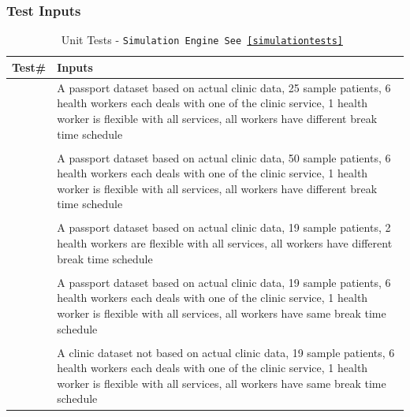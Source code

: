 \documentclass[12pt]{article}
\newcounter{TestCounter}
\begin{document}
	
	\subsubsection{Test Inputs}
	\begin{center}
		\begin{longtable}{c>{\raggedright\arraybackslash}p{8.8cm} }
			\caption{Unit Tests - \texttt{Simulation Engine See \ref{simulationtests} }}\label{SimulationEngine_unit}\\
			\toprule
			\bf Test\# & \bf Inputs \\\midrule
			{TestCounter}\arabic{TestCounter}
			& A passport dataset based on actual clinic data, 25 sample patients, 
			6 health workers each deals with one of the clinic service, 
			1 health worker is flexible with all services, all workers have different break time schedule \\
			\\\midrule
			{TestCounter}\arabic{TestCounter}
			& A passport dataset based on actual clinic data, 50 sample patients, 
			6 health workers each deals with one of the clinic service, 
			1 health worker is flexible with all services, all workers have different break time schedule \\
			\\\midrule
			{TestCounter}\arabic{TestCounter}
			& A passport dataset based on actual clinic data, 19 sample patients, 
			2 health workers are flexible with all services, all workers have different break time schedule \\
			\\\midrule
			{TestCounter}\arabic{TestCounter}
			& A passport dataset based on actual clinic data, 19 sample patients, 
			6 health workers each deals with one of the clinic service, 
			1 health worker is flexible with all services, all workers have same break time schedule \\
			\\\midrule
			{TestCounter}\arabic{TestCounter}
			& A clinic dataset not based on actual clinic data, 19 sample patients, 
			6 health workers each deals with one of the clinic service, 
			1 health worker is flexible with all services, all workers have same break time schedule \\
			\bottomrule
		\end{longtable}
	\end{center}
\end{document}
